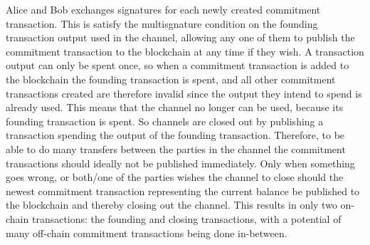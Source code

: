 Alice and Bob exchanges signatures for each newly created commitment transaction.
This is satisfy the multisgnature condition on the founding transaction output used in the channel, allowing any one of them to publish the commitment transaction to the blockchain at any time if they wish. A transaction output can only be spent once, so when a commitment transaction is added to the blockchain the founding transaction is spent, and all other commitment transactions created are therefore invalid since the output they intend to spend is already used. This means that the channel no longer can be used, because its founding transaction is spent. So channels are closed out by publishing a transaction spending the output of the founding transaction. Therefore, to be able to do many transfers between the parties in the channel the commitment transactions should ideally not be published immediately. Only when something goes wrong, or both/one of the parties wishes the channel to close should the newest commitment transaction representing the current balance be published to the blockchain and thereby closing out the channel. This results in only two on-chain transactions: the founding and closing transactions, with a potential of many off-chain commitment transactions being done in-between.
\\

